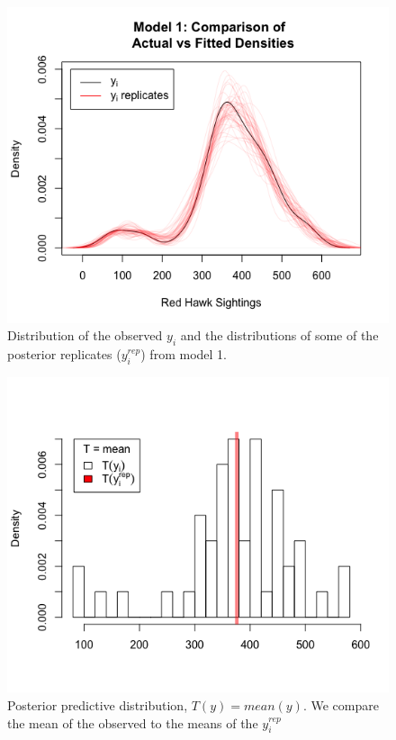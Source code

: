 \documentclass{asaproc}
\begin{document}
\begin{figure}[h!]
    \centering
        \caption{Distribution of the observed $y_i$ and the distributions of some of the posterior replicates ($y_i^{rep}$) from model 1.}
    \label{m1_replicates}
    \includegraphics[scale = 0.3]{m1_fittedDens.png}
\end{figure}
\begin{figure}[h!]
    \centering
        \caption{Posterior  predictive  distribution, $T(y)=mean(y)$. We compare the mean of the observed to the means of the $y_i^{\textit{rep}}$}
    \label{m1_meanHist}
    \includegraphics[scale = 0.3]{m1_meanHist.png}
\end{figure}
\end{document}
